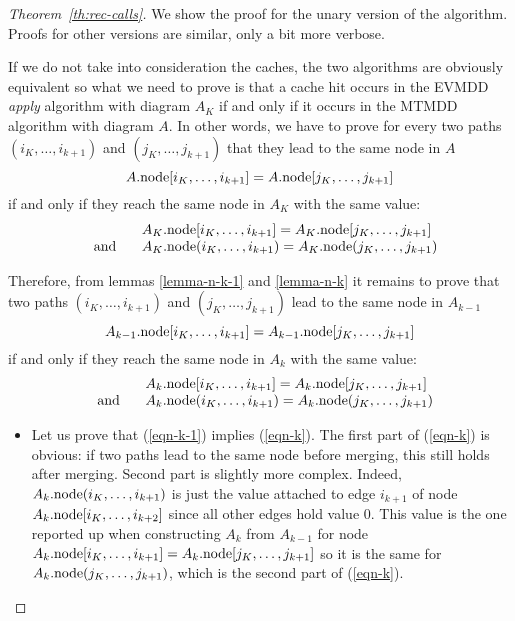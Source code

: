 \documentclass[a4paper,oneside,11pt,pdftex]{llncs}
\newcommand{\m}{\mbox}
\newcommand{\node}[1]{#1{\rm .node}}
\begin{document}
\begin{proof}[Theorem~\ref{th:rec-calls}]
  We show the proof for the unary version of the algorithm.
  Proofs for other versions are similar, only a bit more verbose.

If we do not take into consideration the caches, the two algorithms are obviously equivalent so 
what we need to prove is that a cache hit occurs in the EVMDD \emph{apply} 
algorithm with diagram $A_K$ if and only if it occurs in the MTMDD algorithm 
with diagram $A$. In other words, we have to prove for every two paths 
$(i_K, \ldots, i_{k+1})$ and $(j_K, \ldots, j_{k+1})$ that they lead to the 
same node in $A$
$$
\node{A}[i_K, \ldots, i_{k+1}] = \node{A}[j_K, \ldots, j_{k+1}]
$$
if and only if they reach the same node in $A_K$ with the same value:
$$
\begin{array}{ll}
&\node{A_K}[i_K, \ldots, i_{k+1}] = \node{A_K}[j_K, \ldots, j_{k+1}]\\
\;\;\;\m{and}\;\;\;&
\node{A_K}(i_K, \ldots, i_{k+1}) = \node{A_K}(j_K, \ldots, j_{k+1})
\end{array}
$$

Therefore, from lemmas \vref{lemma-n-k-1} and \vref{lemma-n-k} it remains to prove 
that two paths $(i_K, \ldots, i_{k+1})$ and $(j_K, \ldots, j_{k+1})$ lead to 
the same node in $A_{k-1}$
\begin{equation}
\label{eqn-k-1}
\node{A_{k-1}}[i_K, \ldots, i_{k+1}] = \node{A_{k-1}}[j_K, \ldots, j_{k+1}]
\end{equation}
if and only if they reach the same node in $A_k$ with the same value:
\begin{equation}
\label{eqn-k}
\begin{array}{ll}
&\node{A_k}[i_K, \ldots, i_{k+1}] = \node{A_k}[j_K, \ldots, j_{k+1}]\\
\;\;\;\m{and}\;\;\;&
\node{A_k}(i_K, \ldots, i_{k+1}) = \node{A_k}(j_K, \ldots, j_{k+1})
\end{array}
\end{equation}

\begin{itemize}

\item Let us prove that (\ref{eqn-k-1}) implies (\ref{eqn-k}).
The first part of (\ref{eqn-k}) is obvious: if two paths lead to the same node before
merging, this still holds after merging. Second part is slightly more complex.
Indeed, $\node{A_k}(i_K, \ldots, i_{k+1})$ is just the value attached to edge $i_{k+1}$ of node
$\node{A_k}[i_K, \ldots, i_{k+2}]$ since all other edges hold value $0$. This value
is the one reported up when constructing $A_k$ from $A_{k-1}$ for 
node $\node{A_k}[i_K, \ldots, i_{k+1}] = \node{A_k}[j_K, \ldots, j_{k+1}]$ so it is the
same for $\node{A_k}(j_K, \ldots, j_{k+1})$, which is the second part of (\ref{eqn-k}).


\end{itemize}
\end{proof}
\end{document}
